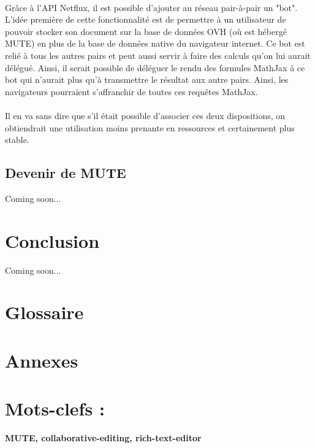 \documentclass[12pt]{article}
\begin{document}
\paragraph{}
Grâce à l'API Netflux, il est possible d'ajouter au réseau pair-à-pair un "bot". L'idée première de cette fonctionnalité est de permettre à un utilisateur de pouvoir stocker son document sur la base de données OVH (où est hébergé MUTE) en plus de la base de données native du navigateur internet. Ce bot est relié à tous les autres pairs et peut aussi servir à faire des calculs qu'on lui aurait délégué. Ainsi, il serait possible de déléguer le rendu des formules MathJax à ce bot qui n'aurait plus qu'à transmettre le résultat aux autre pairs. Ainsi, les navigateurs pourraient s'affranchir de toutes ces requêtes MathJax.
\paragraph{}
Il en va sans dire que s'il était possible d'associer ces deux dispositions, on obtiendrait une utilisation moins prenante en ressources et certainement plus stable.\\

\subsection{Devenir de MUTE}
Coming soon...

\newpage
{}
\section*{Conclusion}
Coming soon...

\newpage
\printbibliography[heading=bibintoc,title={Webographie}]

\newpage
{}
\section*{Glossaire}

\clearpage

\newpage
{}
\section*{Annexes}

\newpage
\section*{Mots-clefs :}
\textbf{MUTE, collaborative-editing, rich-text-editor}
\end{document}
